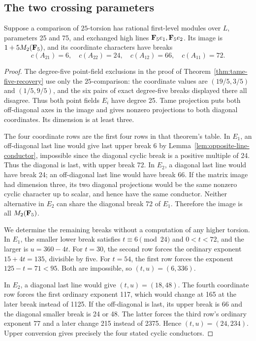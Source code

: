 \subsection{The two crossing parameters}
\begin{lemma}\label{lem:opposite-twenty-five}
Suppose a comparison of $25$-torsion has rational first-level modules over $L$, parameters 25 and 75, and exchanged high lines $\mathbf F_5e_1,\mathbf F_5e_2$. Its image is $1+5M_2(\mathbf F_5)$, and its coordinate characters have breaks
\[
             c(A_{21})=6,\quad c(A_{22})=24,
             \quad c(A_{12})=66,\quad c(A_{11})=72.
\]
\end{lemma}
\begin{proof}
The degree-five point-field exclusions in the proof of Theorem~\ref{thm:tame-five-recovery} use only the $25$-comparison: the coordinate values are $(19/5,3/5)$ and $(1/5,9/5)$, and the six pairs of exact degree-five breaks displayed there all disagree. Thus both point fields $E_i$ have degree 25. Tame projection puts both off-diagonal axes in the image and gives nonzero projections to both diagonal coordinates. Its dimension is at least three.

The four coordinate rows are the first four rows in that theorem's table. In $E_1$, an off-diagonal last line would give last upper break 6 by Lemma~\ref{lem:opposite-line-conductor}, impossible since the diagonal cyclic break is a positive multiple of 24. Thus the diagonal is last, with upper break 72. In $E_2$, a diagonal last line would have break 24; an off-diagonal last line would have break 66. If the matrix image had dimension three, its two diagonal projections would be the same nonzero cyclic character up to scalar, and hence have the same conductor. Neither alternative in $E_2$ can share the diagonal break 72 of $E_1$. Therefore the image is all $M_2(\mathbf F_5)$.

We determine the remaining breaks without a computation of any higher torsion. In $E_1$, the smaller lower break satisfies $t\equiv6\pmod{24}$ and $0<t<72$, and the larger is $u=360-4t$. For $t=30$, the second row forces the ordinary exponent $15+4t=135$, divisible by five. For $t=54$, the first row forces the exponent $125-t=71<95$. Both are impossible, so $(t,u)=(6,336)$.

In $E_2$, a diagonal last line would give $(t,u)=(18,48)$. The fourth coordinate row forces the first ordinary exponent 117, which would change at 165 at the later break instead of 1125. If the off-diagonal is last, its upper break is 66 and the diagonal smaller break is 24 or 48. The latter forces the third row's ordinary exponent 77 and a later change 215 instead of 2375. Hence $(t,u)=(24,234)$. Upper conversion gives precisely the four stated cyclic conductors.
\end{proof}

